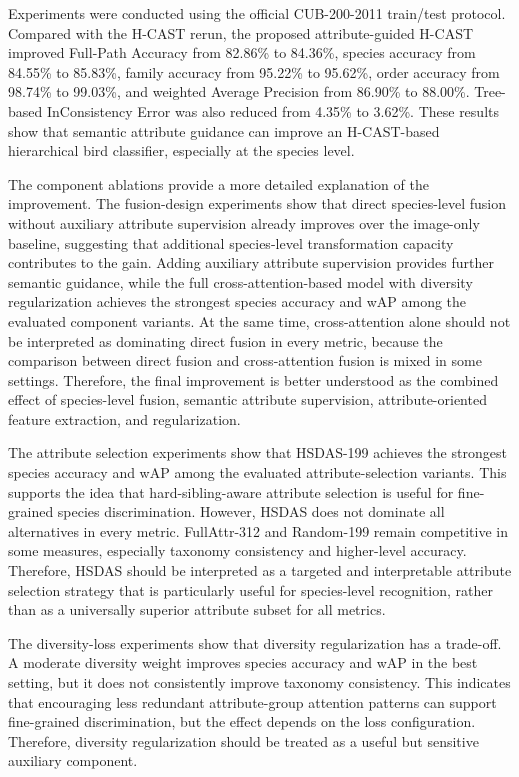 Experiments were conducted using the official CUB-200-2011 train/test protocol. Compared with the H-CAST rerun, the proposed attribute-guided H-CAST improved Full-Path Accuracy from 82.86\% to 84.36\%, species accuracy from 84.55\% to 85.83\%, family accuracy from 95.22\% to 95.62\%, order accuracy from 98.74\% to 99.03\%, and weighted Average Precision from 86.90\% to 88.00\%. Tree-based InConsistency Error was also reduced from 4.35\% to 3.62\%. These results show that semantic attribute guidance can improve an H-CAST-based hierarchical bird classifier, especially at the species level.

The component ablations provide a more detailed explanation of the improvement. The fusion-design experiments show that direct species-level fusion without auxiliary attribute supervision already improves over the image-only baseline, suggesting that additional species-level transformation capacity contributes to the gain. Adding auxiliary attribute supervision provides further semantic guidance, while the full cross-attention-based model with diversity regularization achieves the strongest species accuracy and wAP among the evaluated component variants. At the same time, cross-attention alone should not be interpreted as dominating direct fusion in every metric, because the comparison between direct fusion and cross-attention fusion is mixed in some settings. Therefore, the final improvement is better understood as the combined effect of species-level fusion, semantic attribute supervision, attribute-oriented feature extraction, and regularization.

The attribute selection experiments show that HSDAS-199 achieves the strongest species accuracy and wAP among the evaluated attribute-selection variants. This supports the idea that hard-sibling-aware attribute selection is useful for fine-grained species discrimination. However, HSDAS does not dominate all alternatives in every metric. FullAttr-312 and Random-199 remain competitive in some measures, especially taxonomy consistency and higher-level accuracy. Therefore, HSDAS should be interpreted as a targeted and interpretable attribute selection strategy that is particularly useful for species-level recognition, rather than as a universally superior attribute subset for all metrics.

The diversity-loss experiments show that diversity regularization has a trade-off. A moderate diversity weight improves species accuracy and wAP in the best setting, but it does not consistently improve taxonomy consistency. This indicates that encouraging less redundant attribute-group attention patterns can support fine-grained discrimination, but the effect depends on the loss configuration. Therefore, diversity regularization should be treated as a useful but sensitive auxiliary component.

